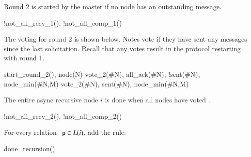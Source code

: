 Round 2 is started by the master if no node has an outstanding message.

\begin{Drules}
      {!not_all_recv_1(), !not_all_comp_1()}
\end{Drules}

The voting for round 2 is shown below.  Notes vote  if they have sent any messages since the last  solicitation.  Recall that any  votes result in the protocol restarting with round 1.

\begin{Drules}
      {start_round_2(), node(N)}
      {vote_2(#N), all_ack(#N), !sent(#N), node_min(#N,M)}
      {vote_2(#N), sent(#N), node_min(#N,M)}
\end{Drules}

The entire async recursive node $i$ is done when all nodes have voted .

\begin{Drules}
      {!not_all_recv_2(), !not_all_comp_2()}
\end{Drules}

For every relation $\dedalus{p} \in L(i)$, add the rule:

\begin{Drules}
      {done_recursion()}
\end{Drules}

